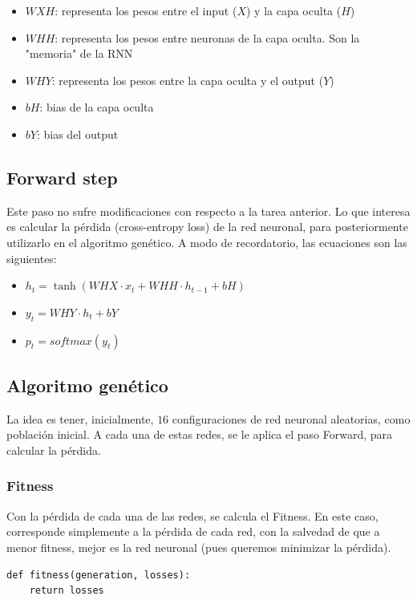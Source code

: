 \documentclass[11pt,letterpaper]{article}
\begin{document}
\begin{itemize}
	\item $WXH$: representa los pesos entre el input ($X$) y la capa oculta ($H$)
	\item $WHH$: representa los pesos entre neuronas de la capa oculta. Son la "memoria" de la RNN
	\item $WHY$: representa los pesos entre la capa oculta y el output ($Y$)
	\item $bH$: bias de la capa oculta
	\item $bY$: bias del output
\end{itemize}


\subsection{Forward step}
Este paso no sufre modificaciones con respecto a la tarea anterior. Lo que interesa
es calcular la pérdida (cross-entropy loss) de la red neuronal, para posteriormente utilizarlo en 
el algoritmo genético. A modo de recordatorio, las ecuaciones son las siguientes:

\begin{itemize}
	\item $h_t = \tanh(WHX \cdot x_t + WHH \cdot h_{t-1} + bH)$
	\item $y_t = WHY \cdot h_t + bY$
	\item $p_t = softmax(y_t)$
\end{itemize}

\subsection{Algoritmo genético}
La idea es tener, inicialmente, $16$ configuraciones de red neuronal aleatorias, como población 
inicial. A cada una de estas redes, se le aplica el paso Forward, para calcular la pérdida.

\subsubsection{Fitness}
Con la pérdida de cada una de las redes, se calcula el Fitness. En este caso, corresponde simplemente 
a la pérdida de cada red, con la salvedad de que a menor fitness, mejor es la red neuronal (pues queremos 
minimizar la pérdida).

\begin{lstlisting}
def fitness(generation, losses):
    return losses
\end{lstlisting}
\end{document}
